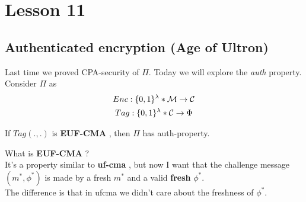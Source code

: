 \chapter*{Lesson 11}
\section{Authenticated encryption (Age of Ultron)}
Last time we proved CPA-security of $\Pi$. Today we will explore the
\textit{auth}  property.
Consider $\Pi$ as
    \begin{gather*}
        Enc:\{0,1\}^{\lambda}*\mathcal{M} \to \mathcal{C} \\
        Tag:\{0,1\}^{\lambda}*\mathcal{C} \to \Phi 
    \end{gather*}
   
    \begin{lemma}
        If $Tag(.,.)$ is \textbf{EUF-CMA} , then $\Pi$ has
    auth-property. 
    \end{lemma}
    
    What is \textbf{EUF-CMA} ?\\ 
    It's a property similar to \textbf{uf-cma} ,
    but now I want that the challenge message $(m^{*}, \phi^{*})$ is made by a
    fresh $m^{*}$ and a valid \textbf{fresh} $\phi^{*}$.\\ 
    The difference is that in ufcma we didn't care about the freshness of
    $\phi^{*}$.


